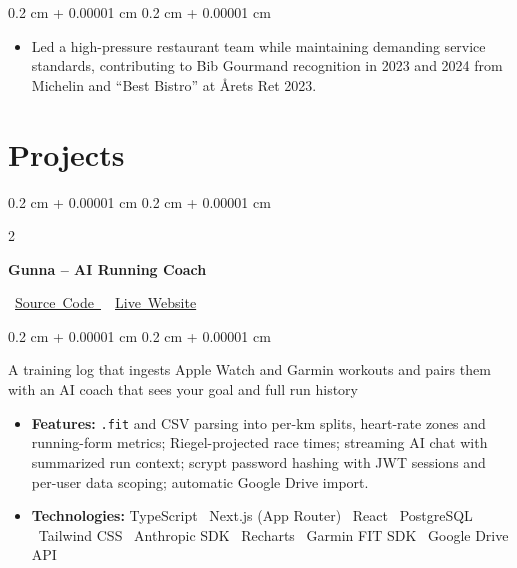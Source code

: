 \documentclass[10pt, letterpaper]{article}
\newenvironment{highlights}{
    \begin{itemize}[
        topsep=0.10 cm,
        parsep=0.10 cm,
        partopsep=0pt,
        itemsep=0pt,
        leftmargin=0.4 cm + 10pt
    ]
}{
    \end{itemize}
} %
\newenvironment{onecolentry}{
    \begin{adjustwidth}{
        0.2 cm + 0.00001 cm
    }{
        0.2 cm + 0.00001 cm
    }
}{
    \end{adjustwidth}
} %
\newenvironment{twocolentry}[2][]{
    \onecolentry
    \def\secondColumn{#2}
    \setcolumnwidth{\fill, 4.5 cm}
    \begin{paracol}{2}
}{
    \switchcolumn \raggedleft \secondColumn
    \end{paracol}
    \endonecolentry
} %
\let\hrefWithoutArrow\href
\renewcommand{\href}[2]{\hrefWithoutArrow{#1}{\ifthenelse{\equal{#2}{}}{ }{#2 }\raisebox{.15ex}{\footnotesize \faExternalLink*}}}
\begin{document}
        \vspace{0.10 cm}

        \begin{onecolentry}
            \begin{highlights}
                \item Led a high-pressure restaurant team while maintaining demanding service standards, contributing to Bib Gourmand recognition in 2023 and 2024 from Michelin and ``Best Bistro'' at Årets Ret 2023.
            \end{highlights}
        \end{onecolentry}


    \section{Projects}

        \begin{twocolentry}{
            \mbox{
                \mbox{\hrefWithoutArrow{https://github.com/Guchito/running-coach}{\color{black}Source Code }}%
                \textbar\
                \mbox{\hrefWithoutArrow{https://running-coach-flame.vercel.app/}{\color{black}Live Website}}%
            }

        }
            \textbf{Gunna – AI Running Coach}

            \vspace{0.10 cm}

        \end{twocolentry}

        \vspace{0.10 cm}

        \begin{onecolentry}
            {A training log that ingests Apple Watch and Garmin workouts and pairs them with an AI coach that sees your goal and full run history}
            \begin{highlights}
                \item \textbf{Features:} \texttt{.fit} and CSV parsing into per-km splits, heart-rate zones and running-form metrics; Riegel-projected race times; streaming AI chat with summarized run context; scrypt password hashing with JWT sessions and per-user data scoping; automatic Google Drive import.
                \item \textbf{Technologies:} TypeScript \textbar\ Next.js (App Router) \textbar\ React \textbar\ PostgreSQL \textbar\ Tailwind CSS \textbar\ Anthropic SDK \textbar\ Recharts \textbar\ Garmin FIT SDK \textbar\ Google Drive API
            \end{highlights}
        \end{onecolentry}
\end{document}
